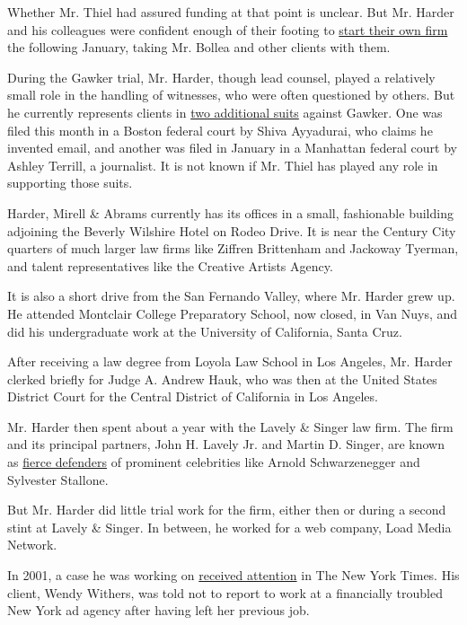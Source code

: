Whether Mr. Thiel had assured funding at that point is unclear. But Mr.
Harder and his colleagues were confident enough of their footing to
\href{http://www.hollywoodreporter.com/thr-esq/new-hollywood-law-firm-launched-428945}{start
their own firm} the following January, taking Mr. Bollea and other
clients with them.

During the Gawker trial, Mr. Harder, though lead counsel, played a
relatively small role in the handling of witnesses, who were often
questioned by others. But he currently represents clients in
\href{http://finance.yahoo.com/news/lawsuits-hulk-hogan-gawker-charles-harder-182257284.html}{two
additional suits} against Gawker. One was filed this month in a Boston
federal court by Shiva Ayyadurai, who claims he invented email, and
another was filed in January in a Manhattan federal court by Ashley
Terrill, a journalist. It is not known if Mr. Thiel has played any role
in supporting those suits.

Harder, Mirell \& Abrams currently has its offices in a small,
fashionable building adjoining the Beverly Wilshire Hotel on Rodeo
Drive. It is near the Century City quarters of much larger law firms
like Ziffren Brittenham and Jackoway Tyerman, and talent representatives
like the Creative Artists Agency.

It is also a short drive from the San Fernando Valley, where Mr. Harder
grew up. He attended Montclair College Preparatory School, now closed,
in Van Nuys, and did his undergraduate work at the University of
California, Santa Cruz.

After receiving a law degree from Loyola Law School in Los Angeles, Mr.
Harder clerked briefly for Judge A. Andrew Hauk, who was then at the
United States District Court for the Central District of California in
Los Angeles.

Mr. Harder then spent about a year with the Lavely \& Singer law firm.
The firm and its principal partners, John H. Lavely Jr. and Martin D.
Singer, are known as
\href{http://www.nytimes3xbfgragh.onion/2011/05/22/business/22singer.html}{fierce
defenders} of prominent celebrities like Arnold Schwarzenegger and
Sylvester Stallone.

But Mr. Harder did little trial work for the firm, either then or during
a second stint at Lavely \& Singer. In between, he worked for a web
company, Load Media Network.

In 2001, a case he was working on
\href{http://www.nytimes3xbfgragh.onion/2001/08/01/jobs/spurned-new-hires-have-their-say.html}{received
attention} in The New York Times. His client, Wendy Withers, was told
not to report to work at a financially troubled New York ad agency after
having left her previous job.

